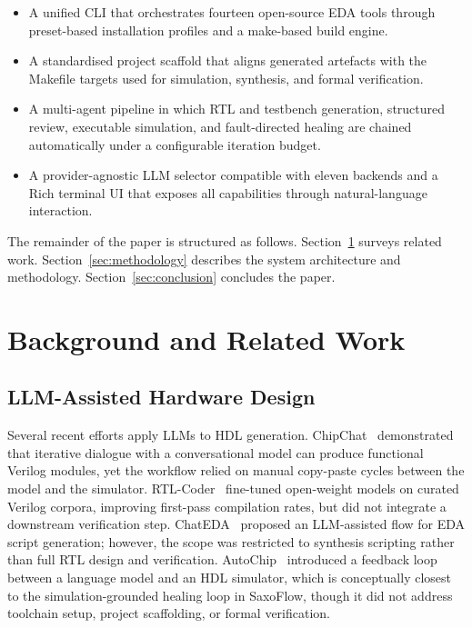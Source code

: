 \begin{itemize}
  \item A unified \ac{CLI} that orchestrates fourteen open-source \ac{EDA}
        tools through preset-based installation profiles and a make-based
        build engine.
  \item A standardised project scaffold that aligns generated artefacts with
        the Makefile targets used for simulation, synthesis, and formal
        verification.
  \item A multi-agent pipeline in which \ac{RTL} and testbench generation,
        structured review, executable simulation, and fault-directed healing
        are chained automatically under a configurable iteration budget.
  \item A provider-agnostic \ac{LLM} selector compatible with eleven backends
        and a Rich terminal \ac{UI} that exposes all capabilities through
        natural-language interaction.
\end{itemize}

The remainder of the paper is structured as follows.
Section~\ref{sec:related} surveys related work.
Section~\ref{sec:methodology} describes the system architecture and
methodology. Section~\ref{sec:conclusion} concludes the paper.

\section{Background and Related Work}
\label{sec:related}

\subsection{LLM-Assisted Hardware Design}

Several recent efforts apply \acp{LLM} to \ac{HDL} generation.
ChipChat~\cite{chipchat} demonstrated that iterative dialogue with a
conversational model can produce functional Verilog modules, yet the workflow
relied on manual copy-paste cycles between the model and the simulator.
RTL-Coder~\cite{rtlcoder} fine-tuned open-weight models on curated Verilog
corpora, improving first-pass compilation rates, but did not integrate a
downstream verification step. ChatEDA~\cite{chateda} proposed an
\ac{LLM}-assisted flow for \ac{EDA} script generation; however, the scope
was restricted to synthesis scripting rather than full \ac{RTL} design and
verification. AutoChip~\cite{autochip} introduced a feedback loop between a
language model and an \ac{HDL} simulator, which is conceptually closest to
the simulation-grounded healing loop in SaxoFlow, though it did not address
toolchain setup, project scaffolding, or formal verification.

